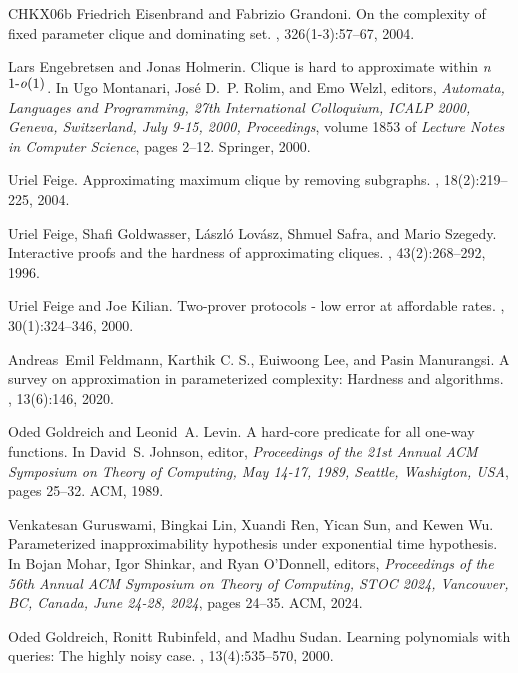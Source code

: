 \documentclass[10pt,a4paper]{article}
\begin{document}
\begin{thebibliography}{CHKX06b}
Friedrich Eisenbrand and Fabrizio Grandoni.
\newblock On the complexity of fixed parameter clique and dominating set.
, 326(1-3):57--67, 2004.

Lars Engebretsen and Jonas Holmerin.
\newblock Clique is hard to approximate within
  \emph{n}\({}^{\mbox{1-\emph{o}(1)}}\).
\newblock In Ugo Montanari, Jos{\'{e}} D.~P. Rolim, and Emo Welzl, editors,
  {\em Automata, Languages and Programming, 27th International Colloquium,
  {ICALP} 2000, Geneva, Switzerland, July 9-15, 2000, Proceedings}, volume 1853
  of {\em Lecture Notes in Computer Science}, pages 2--12. Springer, 2000.

Uriel Feige.
\newblock Approximating maximum clique by removing subgraphs.
, 18(2):219--225, 2004.

Uriel Feige, Shafi Goldwasser, L{\'{a}}szl{\'{o}} Lov{\'{a}}sz, Shmuel Safra,
  and Mario Szegedy.
\newblock Interactive proofs and the hardness of approximating cliques.
, 43(2):268--292, 1996.

Uriel Feige and Joe Kilian.
\newblock Two-prover protocols - low error at affordable rates.
, 30(1):324--346, 2000.

Andreas~Emil Feldmann, {Karthik {C. S.}}, Euiwoong Lee, and Pasin Manurangsi.
\newblock A survey on approximation in parameterized complexity: Hardness and
  algorithms.
, 13(6):146, 2020.

Oded Goldreich and Leonid~A. Levin.
\newblock A hard-core predicate for all one-way functions.
\newblock In David~S. Johnson, editor, {\em Proceedings of the 21st Annual
  {ACM} Symposium on Theory of Computing, May 14-17, 1989, Seattle, Washigton,
  {USA}}, pages 25--32. {ACM}, 1989.

Venkatesan Guruswami, Bingkai Lin, Xuandi Ren, Yican Sun, and Kewen Wu.
\newblock Parameterized inapproximability hypothesis under exponential time
  hypothesis.
\newblock In Bojan Mohar, Igor Shinkar, and Ryan O'Donnell, editors, {\em
  Proceedings of the 56th Annual {ACM} Symposium on Theory of Computing, {STOC}
  2024, Vancouver, BC, Canada, June 24-28, 2024}, pages 24--35. {ACM}, 2024.

Oded Goldreich, Ronitt Rubinfeld, and Madhu Sudan.
\newblock Learning polynomials with queries: The highly noisy case.
, 13(4):535--570, 2000.


\end{thebibliography}
\end{document}
